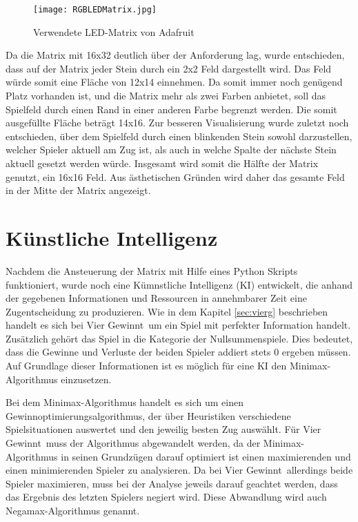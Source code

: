 \begin{figure}[!hbt]
	\centering
	\texttt{[image: RGBLEDMatrix.jpg]}
	\caption{Verwendete LED-Matrix von Adafruit}
\end{figure}

Da die Matrix mit 16x32 deutlich über der Anforderung lag, wurde entschieden, dass auf der Matrix jeder Stein durch ein 2x2 Feld  dargestellt wird.
Das Feld würde somit eine Fläche von 12x14 einnehmen. Da somit immer noch genügend Platz vorhanden ist, und die Matrix mehr als zwei Farben anbietet, soll das Spielfeld durch einen Rand in einer anderen Farbe begrenzt werden.
Die somit ausgefüllte Fläche beträgt 14x16.
Zur besseren Visualisierung wurde zuletzt noch entschieden, über dem Spielfeld durch einen blinkenden Stein sowohl darzustellen, welcher Spieler aktuell am Zug ist, als auch in welche Spalte der nächste Stein aktuell gesetzt werden würde.
Insgesamt wird somit die Hälfte der Matrix genutzt, ein 16x16 Feld.
Aus ästhetischen Gründen wird daher das gesamte Feld in der Mitte der Matrix angezeigt.

\section{Künstliche Intelligenz}
Nachdem die Ansteuerung der Matrix mit Hilfe eines Python Skripts funktioniert, wurde noch eine Kümnstliche Intelligenz (KI) entwickelt, die anhand der gegebenen Informationen und Ressourcen in annehmbarer Zeit eine Zugentscheidung zu produzieren.
Wie in dem Kapitel \ref{sec:vierg} beschrieben handelt es sich bei \glqq Vier Gewinnt\grqq ~um ein Spiel mit perfekter Information handelt. Zusätzlich gehört das Spiel in die Kategorie der Nullsummenspiele. Dies bedeutet, dass die Gewinne und Verluste der beiden Spieler addiert stets 0 ergeben müssen.
Auf Grundlage dieser Informationen ist es möglich für eine KI den Minimax-Algorithmus einzusetzen.

Bei dem Minimax-Algorithmus handelt es sich um einen Gewinnoptimierungsalgorithmus, der über Heuristiken verschiedene Spielsituationen auswertet und den jeweilig besten Zug auswählt.
Für \glqq Vier Gewinnt\grqq ~muss der Algorithmus abgewandelt werden, da der Minimax-Algorithmus in seinen Grundzügen darauf optimiert ist einen maximierenden und einen minimierenden Spieler zu analysieren. Da bei \glqq Vier Gewinnt\grqq ~allerdings beide Spieler maximieren, muss bei der Analyse jeweils darauf geachtet werden, dass das Ergebnis des letzten Spielers negiert wird. Diese Abwandlung wird auch Negamax-Algorithmus genannt.
